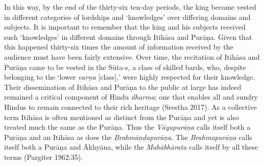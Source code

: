 In this way, by the end of the thirty-six ten-day periods, the king became vested in different categories of lordships and ‘knowledges’ over differing domains and subjects. It is important to remember that the king and his subjects received such ‘knowledges’ in different domains through Itihāsa and Purāṇa. Given that this happened thirty-six times the amount of information received by the audience must have been fairly extensive. Over time, the recitation of Itihāsa and Purāṇa came to be vested in the Sūta-s, a class of skilled bards, who, despite belonging to the ‘lower \textit{varṇa} [class],’ were highly respected for their knowledge. Their dissemination of Itihāsa and Purāṇa to the public at large has indeed remained a critical component of Hindu \textit{dharma}; one that enables all and sundry Hindus to remain connected to their rich heritage (Srestha 2017). As a collective term Itihāsa is often mentioned as distinct from the Purāṇa and yet is also treated much the same as the Purāṇa. Thus the \textit{Vāyupurāṇa} calls itself both a Purāṇa and an Itihāsa as does the \textit{Brahmāṇḍapurāṇa}. The \textit{Brahmapurāṇa}   calls itself both a Purāṇa and Ākhyāna, while the \textit{Mahābhārata} calls itself by all these terms (Pargiter 1962:35). 

